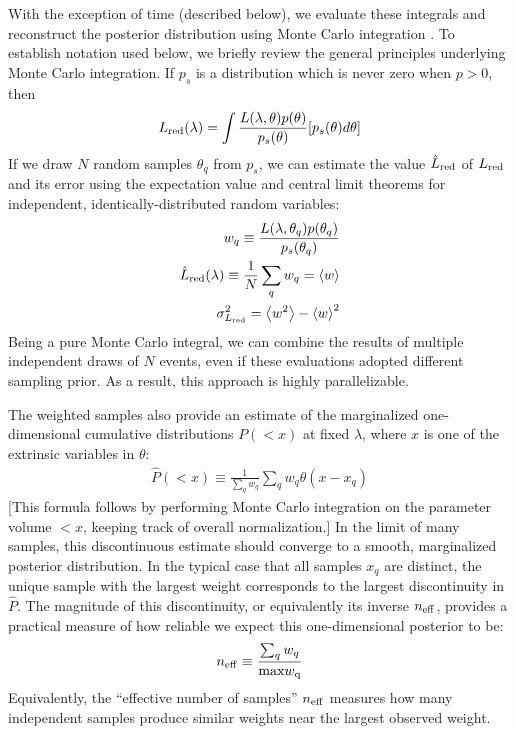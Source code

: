 \documentclass[twocolumn,prd,nofootinbib]{revtex4}
\begin{document}
With the exception of time (described below), we evaluate these integrals and reconstruct the posterior distribution using Monte Carlo integration
\cite{book-mm-NumericalRecipies,peter1978new}.   To establish notation used below, we briefly review the general principles  underlying Monte Carlo
integration.  If $p_s$ is a distribution which is never zero when $p>0$, then 
\begin{eqnarray}
L_{\rm red}(\lambda) = \int \frac{L(\lambda,\theta) p(\theta)}{p_s(\theta)} [p_s(\theta) d\theta]
\end{eqnarray}
% 
If we draw $N$ random samples $\theta_q$ from $p_s$, we can estimate the value $\hat{L}_{\rm red}$ of $L_{\rm red}$ and its error using the
expectation value and central limit theorems for independent, identically-distributed random variables:
\begin{eqnarray}
w_q \equiv \frac{L(\lambda,\theta_q) p(\theta_q)}{p_s(\theta_q)} \\
\hat{L}_{\rm red}(\lambda) \equiv \frac{1}{N} \sum_q w_q = \left<w\right> \\
\sigma_{L_{\rm red}}^2 = \left<w^2\right> - \left<w\right>^2
\end{eqnarray}
Being a pure Monte Carlo integral, we can  combine the results of multiple independent draws of $N$ events, even if these
evaluations adopted different sampling prior.  As a result, this approach is highly parallelizable.  


The weighted samples also provide an estimate of the marginalized one-dimensional cumulative distributions $P(<x)$ at
fixed $\lambda$, where $x$ is one of the extrinsic variables in $\theta$:
\begin{eqnarray}
\hat{P}(<x) \equiv \frac{1}{\sum_q w_q} \sum_q w_q \theta(x-x_q)
\end{eqnarray}
[This formula follows by performing Monte Carlo integration on the parameter volume $<x$, keeping track of overall
  normalization.]  
In the limit of many samples, this discontinuous estimate should converge to a smooth, marginalized posterior distribution.  
In the typical case that all samples $x_q$ are distinct, the unique sample with the largest weight corresponds to the
largest discontinuity in $\hat{P}$.  The magnitude of this discontinuity, or equivalently its inverse $n_{\rm eff}$,
provides a practical measure of how reliable we expect this one-dimensional posterior to be:
\begin{eqnarray}
n_{\rm eff} \equiv \frac{\sum_q w_q}{\text{max} w_{\rm q}}
\end{eqnarray}
Equivalently, the ``effective number of samples'' $n_{\rm eff}$ measures how many independent samples produce similar
weights near the largest observed weight.  
\end{document}
